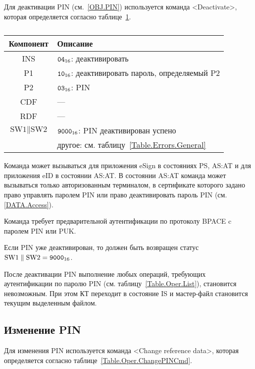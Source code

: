 Для деактивации PIN (см.~\ref{OBJ.PIN}) 
используется команда <Deactivate>, 
которая определяется согласно 
таблице~\ref{Table.Oper.DeactivatePINCmd}.

\begin{table}[hbt]
\caption{}\label{Table.Oper.DeactivatePINCmd}
\begin{tabular}{|c|p{14cm}|}
\hline
Компонент & Описание \\
\hline
\hline
INS & $\texttt{04}_{16}$: деактивировать \\
\hline
P1 & $\texttt{10}_{16}$: деактивировать пароль, определяемый P2\\
\hline
P2 & $\texttt{03}_{16}$: PIN \\
\hline
CDF &  --- \\
\hline 
RDF & --- \\
\hline
$\text{SW1} \parallel \text{SW2}$ & 
$\texttt{9000}_{16}$: PIN деактивирован успено \\
  & другое: см. таблицу~\ref{Table.Errors.General}\\
\hline
\end{tabular}
\end{table}

Команда может вызываться для приложения eSign в состояниях 
PS, AS:AT и для приложения eID в состоянии AS:AT. 
В состоянии AS:AT команда может вызываться 
только авторизованным терминалом,
в сертификате которого задано право 
управлять паролем PIN или право деактивировать 
пароль PIN (см. \ref{DATA.Access}).

Команда требует предварительной аутентификации по 
протоколу BPACE c паролем PIN или PUK. 

Если PIN уже деактивирован, то должен быть возвращен 
статус $\text{SW1} \parallel \text{SW2} = \texttt{9000}_{16}$.

После деактивации PIN выполнение любых операций, 
требующих аутентификации по паролю PIN (см. таблицу~\ref{Table.Oper.List}), 
становится невозможным. 
При этом КТ переходит в состояние IS и мастер-файл 
становится текущим выделенным файлом. 


\subsection{Изменение PIN}
\label{Oper.Descr.ChangePIN}

Для изменения PIN используется команда <Change reference data>,
которая определяется согласно 
таблице~\ref{Table.Oper.ChangePINCmd}.

